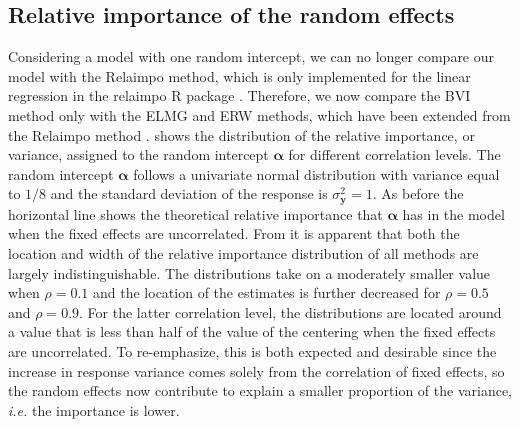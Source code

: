 \subsection{Relative importance of the random effects}
\label{sec:relimp_random}
Considering a model with one random intercept, we can no longer compare our model with the Relaimpo method, which is only implemented for the linear regression in the relaimpo R package \citep{gromping_relaimpo}. Therefore, we now compare the BVI method only with the ELMG and ERW methods, which have been extended from the Relaimpo method \citep{matre}.
 shows the distribution of the relative importance, or variance, assigned to the random intercept $\boldsymbol{\alpha}$ for different correlation levels. 
The random intercept $\boldsymbol{\alpha}$ follows a univariate normal distribution with variance equal to $1/8$ and the standard deviation of the response is $\sigma^2_{\mathbf{y}}=1$. 
As before the horizontal line shows the theoretical relative importance that $\boldsymbol{\alpha}$ has in the model when the fixed effects are uncorrelated.
\newline
\newline
From  it is apparent that both the location and width of the relative importance distribution of all methods are largely indistinguishable. 
The distributions take on a moderately smaller value when $\rho=0.1$ and the location of the estimates is further decreased for $\rho=0.5$ and $\rho=0.9$. 
For the latter correlation level, the distributions are located around a value that is less than half of the value of the centering when the fixed effects are uncorrelated. 
To re-emphasize, this is both expected and desirable since the increase in response variance comes solely from the correlation of fixed effects, so the random effects now contribute to explain a smaller proportion of the variance, \textit{i.e.} the importance is lower.
